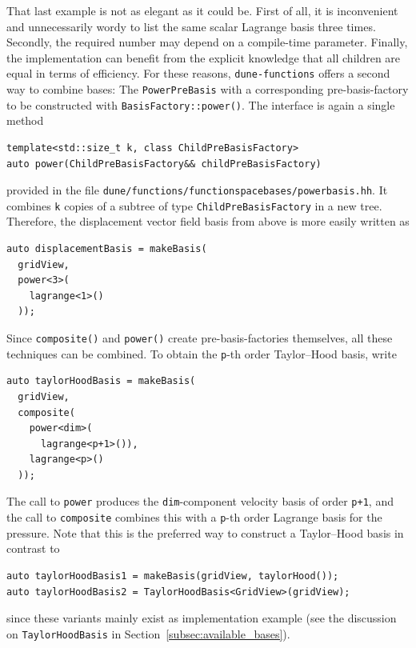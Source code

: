 \documentclass[a4paper,10pt,headings=normal,bibliography=totoc]{scrartcl}
\newcommand{\cpp}[1]{\lstinline[basicstyle=\ttfamily]!#1!}
\newcommand{\dunemodule}[1]{\texttt{#1}}
\newcommand{\file}[1]{\texttt{#1}}
\begin{document}
That last example is not as elegant as it could be.  First of all, it is inconvenient and unnecessarily
wordy to list the same scalar Lagrange basis three times.  Secondly, the required number may depend on
a compile-time parameter.
Finally, the implementation can benefit from the explicit knowledge that
all children are equal in terms of efficiency.
For these reasons, \dunemodule{dune-functions}
offers a second way to combine bases: The \cpp{PowerPreBasis} with a
corresponding pre-basis-factory to be constructed with \cpp{BasisFactory::power()}. 
The interface is again a single method
\begin{lstlisting}[style=Interface]
template<std::size_t k, class ChildPreBasisFactory>
auto power(ChildPreBasisFactory&& childPreBasisFactory)
\end{lstlisting}
provided in the file \file{dune/functions/functionspacebases/powerbasis.hh}.
It combines \cpp{k} copies of a subtree of type \cpp{ChildPreBasisFactory} in a new tree.  Therefore, the
displacement vector field basis from above is more easily written as
\begin{lstlisting}[style=Example]
auto displacementBasis = makeBasis(
  gridView,
  power<3>(
    lagrange<1>()
  ));
\end{lstlisting}
Since \cpp{composite()} and \cpp{power()} create pre-basis-factories themselves,
all these techniques can be combined. To obtain the \cpp{p}-th order Taylor--Hood basis,
write
\begin{lstlisting}[style=Example]
auto taylorHoodBasis = makeBasis(
  gridView,
  composite(
    power<dim>(
      lagrange<p+1>()),
    lagrange<p>()
  ));
\end{lstlisting}
The call to \cpp{power} produces the \cpp{dim}-component velocity basis of order \cpp{p+1},
and the call to \cpp{composite} combines this with a \cpp{p}-th order Lagrange basis for the pressure.
Note that this is the preferred way to construct a Taylor--Hood basis in contrast to
\begin{lstlisting}[style=Example]
auto taylorHoodBasis1 = makeBasis(gridView, taylorHood());
auto taylorHoodBasis2 = TaylorHoodBasis<GridView>(gridView);
\end{lstlisting}
since these variants mainly exist as implementation example (see the discussion on \cpp{TaylorHoodBasis} in Section~\ref{subsec:available_bases}).
\end{document}

